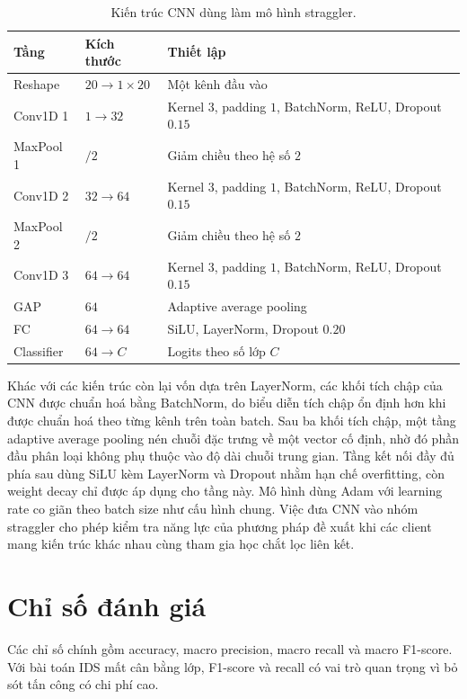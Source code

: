 \begin{table}[H]
    \centering
    \caption{Kiến trúc CNN dùng làm mô hình straggler.}
    \label{tab:cnn_arch}
    \begin{tabular}{lll}
        \hline
        Tầng & Kích thước & Thiết lập \\
        \hline
        Reshape & $20\rightarrow1\times20$ & Một kênh đầu vào \\
        Conv1D 1 & $1\rightarrow32$ & Kernel $3$, padding $1$, BatchNorm, ReLU, Dropout $0.15$ \\
        MaxPool 1 & $/2$ & Giảm chiều theo hệ số $2$ \\
        Conv1D 2 & $32\rightarrow64$ & Kernel $3$, padding $1$, BatchNorm, ReLU, Dropout $0.15$ \\
        MaxPool 2 & $/2$ & Giảm chiều theo hệ số $2$ \\
        Conv1D 3 & $64\rightarrow64$ & Kernel $3$, padding $1$, BatchNorm, ReLU, Dropout $0.15$ \\
        GAP & $64$ & Adaptive average pooling \\
        FC & $64\rightarrow64$ & SiLU, LayerNorm, Dropout $0.20$ \\
        Classifier & $64\rightarrow C$ & Logits theo số lớp $C$ \\
        \hline
    \end{tabular}
\end{table}

Khác với các kiến trúc còn lại vốn dựa trên LayerNorm, các khối tích chập của CNN được chuẩn hoá bằng BatchNorm, do biểu diễn tích chập ổn định hơn khi được chuẩn hoá theo từng kênh trên toàn batch. Sau ba khối tích chập, một tầng adaptive average pooling nén chuỗi đặc trưng về một vector cố định, nhờ đó phần đầu phân loại không phụ thuộc vào độ dài chuỗi trung gian. Tầng kết nối đầy đủ phía sau dùng SiLU kèm LayerNorm và Dropout nhằm hạn chế overfitting, còn weight decay chỉ được áp dụng cho tầng này. Mô hình dùng Adam với learning rate co giãn theo batch size như cấu hình chung. Việc đưa CNN vào nhóm straggler cho phép kiểm tra năng lực của phương pháp đề xuất khi các client mang kiến trúc khác nhau cùng tham gia học chắt lọc liên kết.

\section{Chỉ số đánh giá}

Các chỉ số chính gồm accuracy, macro precision, macro recall và macro F1-score. Với bài toán IDS mất cân bằng lớp, F1-score và recall có vai trò quan trọng vì bỏ sót tấn công có chi phí cao.

